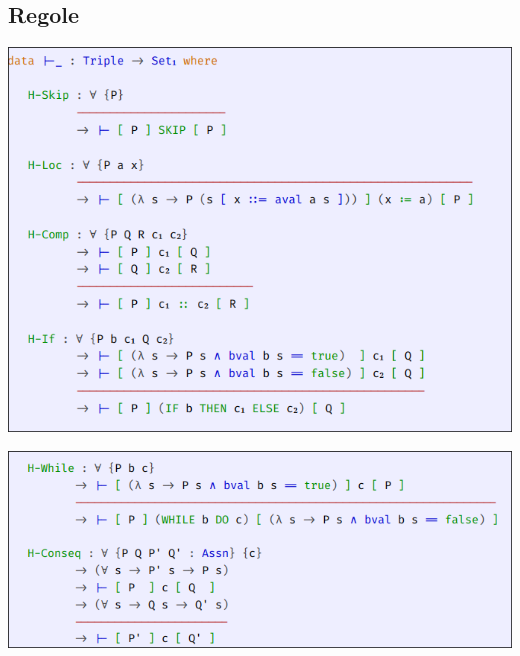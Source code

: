\subsection{Regole}

\begin{center}
 \includegraphics[scale = 0.4]{images/IMP/T1}
\end{center}

\begin{center}
 \includegraphics[scale = 0.4]{images/IMP/T2}
\end{center}


